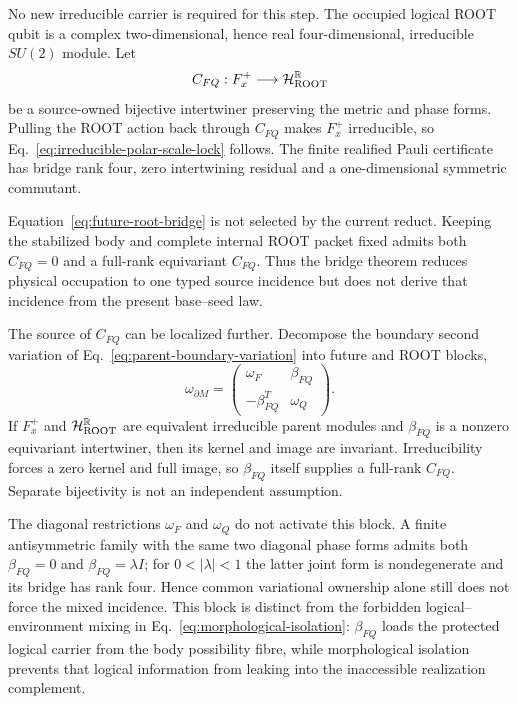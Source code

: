 \documentclass[11pt]{article}
\begin{document}
No new irreducible carrier is required for this step. The occupied logical
ROOT qubit is a complex two-dimensional, hence real four-dimensional,
irreducible $SU(2)$ module. Let
\begin{equation}
 C_{FQ}:F_x^+\longrightarrow \mathcal H_{\rm ROOT}^{\mathbb R}
 \label{eq:future-root-bridge}
\end{equation}
be a source-owned bijective intertwiner preserving the metric and phase
forms. Pulling the ROOT action back through $C_{FQ}$ makes $F_x^+$
irreducible, so Eq.~\eqref{eq:irreducible-polar-scale-lock} follows. The
finite realified Pauli certificate has bridge rank four, zero intertwining
residual and a one-dimensional symmetric commutant.

Equation~\eqref{eq:future-root-bridge} is not selected by the current reduct.
Keeping the stabilized body and complete internal ROOT packet fixed admits
both $C_{FQ}=0$ and a full-rank equivariant $C_{FQ}$. Thus the bridge theorem
reduces physical occupation to one typed source incidence but does not derive
that incidence from the present base--seed law.

The source of $C_{FQ}$ can be localized further. Decompose the boundary
second variation of Eq.~\eqref{eq:parent-boundary-variation} into future and
ROOT blocks,
\begin{equation}
 \omega_{\partial M}=
 \begin{pmatrix}
  \omega_F & \beta_{FQ}\\
  -\beta_{FQ}^{T} & \omega_Q
 \end{pmatrix}.
 \label{eq:mixed-future-root-boundary-form}
\end{equation}
If $F_x^+$ and $\mathcal H_{\rm ROOT}^{\mathbb R}$ are equivalent
irreducible parent modules and $\beta_{FQ}$ is a nonzero equivariant
intertwiner, then its kernel and image are invariant. Irreducibility forces a
zero kernel and full image, so $\beta_{FQ}$ itself supplies a full-rank
$C_{FQ}$. Separate bijectivity is not an independent assumption.

The diagonal restrictions $\omega_F$ and $\omega_Q$ do not activate this
block. A finite antisymmetric family with the same two diagonal phase forms
admits both $\beta_{FQ}=0$ and $\beta_{FQ}=\lambda I$; for
$0<|\lambda|<1$ the latter joint form is nondegenerate and its bridge has rank
four. Hence common variational ownership alone still does not force the mixed
incidence. This block is distinct from the forbidden logical--environment
mixing in Eq.~\eqref{eq:morphological-isolation}: $\beta_{FQ}$ loads the
protected logical carrier from the body possibility fibre, while morphological
isolation prevents that logical information from leaking into the inaccessible
realization complement.
\end{document}
